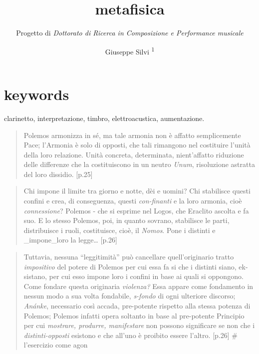 \documentclass{gs-adonis}
\title{metafisica}
\subtitle{Progetto di \emph{Dottorato di Ricerca in Composizione e Performance musicale}}
\author{Giuseppe Silvi \textsuperscript{1}}
\begin{document}
\maketitle
\section*{keywords}
clarinetto, interpretazione, timbro, elettroacustica, aumentazione.

\begin{quote}
Polemos armonizza in sé, ma tale armonia non è affatto semplicemente
Pace; l'Armonia è solo di opposti, che tali rimangono nel costituire
l'unità della loro relazione. Unità concreta, determinata, nient'affatto
riduzione delle differenze che la costituiscono in un neutro
\emph{Unum}, risoluzione astratta del loro dissidio. {[}p.25{]}
\end{quote}

\begin{quote}
Chi impone il limite tra giorno e notte, dèi e uomini? Chi stabilisce
questi confini e crea, di conseguenza, questi \emph{con-finanti} e la
loro armonia, cioè \emph{connessione}? Polemos - che si esprime nel
Logos, che Eraclito ascolta e fa suo. E lo stesso Polemos, poi, in
quanto sovrano, stabilisce le parti, distribuisce i ruoli, costituisce,
cioè, il \emph{Nomos}. Pone i distinti e \_impone\_loro la legge\ldots{}
{[}p.26{]}
\end{quote}

\begin{quote}
Tuttavia, nessuna ``leggitimità'' può cancellare quell'originario tratto
\emph{impositivo} del potere di Polemos per cui essa fa si che i
distinti siano, ek-sistano, per cui esso impone loro i confini in base
ai quali si oppongono. Come fondare questa originaria \emph{violenza?}
Essa appare come fondamento in nessun modo a sua volta fondabile,
\emph{s-fondo} di ogni ulteriore discorso; \emph{Anánke}, necessario
così accada, pre-potente rispetto alla stessa potenza di Polemos;
Polemos infatti opera soltanto in base al pre-potente Principio per cui
\emph{mostrare, produrre, manifestare} non possono significare se non
che i \emph{distinti-opposti} esistono e che all'uno è proibito essere
l'altro. {[}p.26{]} \# l'esercizio come agon
\end{quote}
\end{document}
